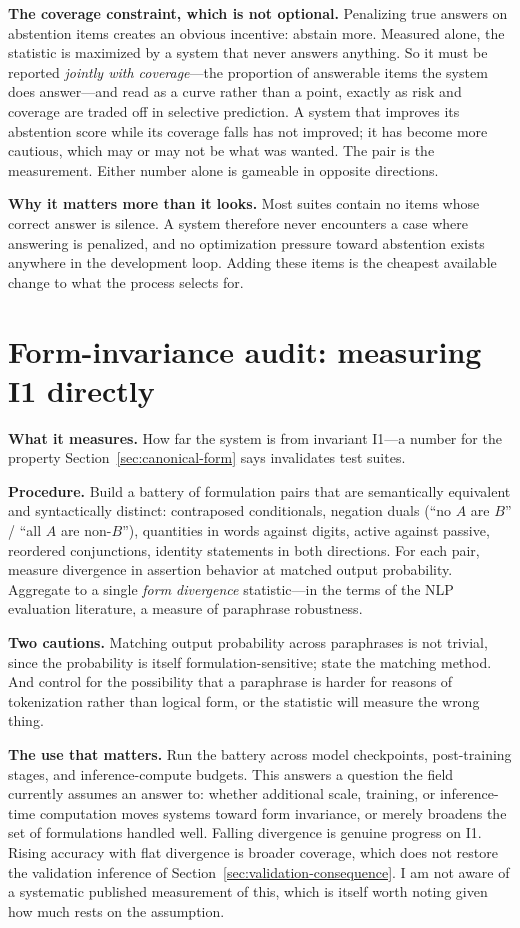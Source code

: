 \textbf{The coverage constraint, which is not optional.} Penalizing true answers on
abstention items creates an obvious incentive: abstain more. Measured alone, the
statistic is maximized by a system that never answers anything. So it must be reported
\emph{jointly with coverage}---the proportion of answerable items the system does
answer---and read as a curve rather than a point, exactly as risk and coverage are
traded off in selective prediction. A system that improves its abstention score while
its coverage falls has not improved; it has become more cautious, which may or may not
be what was wanted. The pair is the measurement. Either number alone is gameable in
opposite directions.

\textbf{Why it matters more than it looks.} Most suites contain no items whose
correct answer is silence. A system therefore never encounters a case where
answering is penalized, and no optimization pressure toward abstention exists
anywhere in the development loop. Adding these items is the cheapest available
change to what the process selects for.

\section{Form-invariance audit: measuring I1 directly}
\label{sec:form-audit}

\textbf{What it measures.} How far the system is from invariant I1---a number for
the property Section~\ref{sec:canonical-form} says invalidates test suites.

\textbf{Procedure.} Build a battery of formulation pairs that are semantically
equivalent and syntactically distinct: contraposed conditionals, negation duals
(``no $A$ are $B$'' / ``all $A$ are non-$B$''), quantities in words against digits,
active against passive, reordered conjunctions, identity statements in both
directions. For each pair, measure divergence in assertion behavior at matched
output probability. Aggregate to a single \emph{form divergence} statistic---in the terms of the NLP
evaluation literature, a measure of paraphrase robustness.

\textbf{Two cautions.} Matching output probability across paraphrases is not
trivial, since the probability is itself formulation-sensitive; state the matching
method. And control for the possibility that a paraphrase is harder for reasons of
tokenization rather than logical form, or the statistic will measure the wrong
thing.

\textbf{The use that matters.} Run the battery across model checkpoints,
post-training stages, and inference-compute budgets. This answers a question the
field currently assumes an answer to: whether additional scale, training, or
inference-time computation moves systems toward form invariance, or merely broadens
the
set of formulations handled well. Falling divergence is genuine progress on I1.
Rising accuracy with flat divergence is broader coverage, which does not restore
the validation inference of
Section~\ref{sec:validation-consequence}. I am not aware of a systematic published
measurement of this, which is itself worth noting given how much rests on the
assumption.

